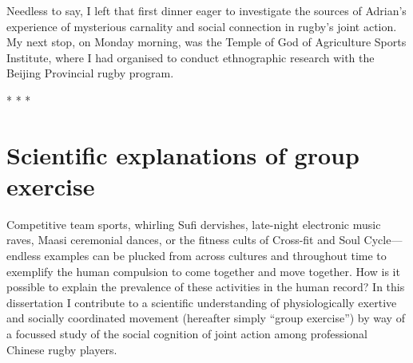 \begin{CJK}{UTF8}{gbsn}
Needless to say, I left that first dinner eager to investigate the sources of Adrian's experience of mysterious carnality and social connection in rugby's joint action.  My next stop, on Monday morning, was the Temple of God of Agriculture Sports Institute, where I had organised to conduct ethnographic research with the Beijing Provincial rugby program.


                            \begin{center}
                              * * *
                            \end{center}



\section{Scientific explanations of group exercise}
Competitive team sports, whirling Sufi dervishes, late-night electronic music raves, Maasi ceremonial dances, or the fitness cults of Cross-fit and Soul Cycle---endless examples can be plucked from across cultures and throughout time to exemplify the human compulsion to come together and move together.  How is it possible to explain the prevalence of these activities in the human record?  In this dissertation I contribute to a scientific understanding of physiologically exertive and socially coordinated movement (hereafter simply ``group exercise'') by way of a focussed study of the social cognition of joint action among professional Chinese rugby players.


\end{CJK}
